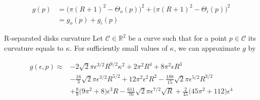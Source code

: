 \begin{align*}
	g(p) &= \big( \pi (R+1)^2 - \Theta_o(p)\big)^2 + \big(\pi (R+1)^2 - \Theta_i(p) )^2\\
		 &= g_o(p) + g_i(p)
\end{align*}

\begin{claim}{R-separated disks curvature}\label{claim:r-separated-disks}
 Let $\mathcal{C} \in \mathbb{R}^2$ be a curve such that for a point $p \in \mathcal{C}$ its curvature equals to $\kappa$. For sufficiently small values of $\kappa$, we can approximate $g$ by

\begin{align*}
g(\epsilon,p) \approx &-2 \sqrt{2}\pi \epsilon^{3/2}R^{9/2}\kappa^2 + 2\pi^2R^4 + 8\pi^2\epsilon R^3\\
 &- \frac{16}{3}\sqrt{2}\pi\epsilon^{3/2}R^{5/2} + 12\pi^2\epsilon^2R^2 - \frac{188}{15}\sqrt{2}\pi\epsilon^{5/2}R^{3/2} \\ 
 &+ \frac{8}{9}\big(9\pi^2 +8\big)\epsilon^3R - \frac{611}{70}\sqrt{2}\pi\epsilon^{7/2}\sqrt{R} + \frac{2}{45}\big(45\pi^2 + 112\big)\epsilon^4
\end{align*} 
\end{claim}


